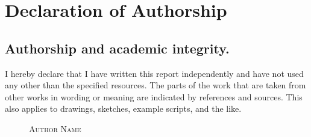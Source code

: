 \newpage
\justifying
\section*{Declaration of Authorship}

\subsection*{Authorship and academic integrity.}

I hereby declare that I have written this report independently and have not used any other than the specified resources. The parts of the work that are taken from other works in wording or meaning are indicated by references and sources. This also applies to drawings, sketches, example scripts, and the like.

\begin{figure}[h]
    \hfill\begin{minipage}{4cm}
        \centering
        \textsc{Author Name}
    \end{minipage}\hspace{1cm}
\end{figure}